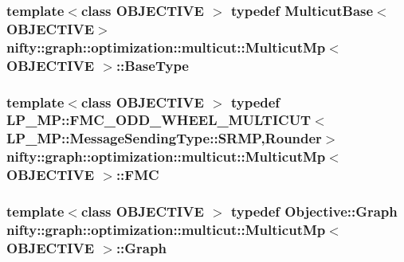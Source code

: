 \subsubsection[{Base\+Type}]{\setlength{\rightskip}{0pt plus 5cm}template$<$class O\+B\+J\+E\+C\+T\+I\+V\+E $>$ typedef {\bf Multicut\+Base}$<$O\+B\+J\+E\+C\+T\+I\+V\+E$>$ {\bf nifty\+::graph\+::optimization\+::multicut\+::\+Multicut\+Mp}$<$ O\+B\+J\+E\+C\+T\+I\+V\+E $>$\+::{\bf Base\+Type}}\label{classnifty_1_1graph_1_1optimization_1_1multicut_1_1MulticutMp_aa1b1a033f9090852c7c4529eec9623ef}
\hypertarget{classnifty_1_1graph_1_1optimization_1_1multicut_1_1MulticutMp_a7552c779f02ea5560312fd9fb10f248d}{}
\subsubsection[{F\+M\+C}]{\setlength{\rightskip}{0pt plus 5cm}template$<$class O\+B\+J\+E\+C\+T\+I\+V\+E $>$ typedef L\+P\+\_\+\+M\+P\+::\+F\+M\+C\+\_\+\+O\+D\+D\+\_\+\+W\+H\+E\+E\+L\+\_\+\+M\+U\+L\+T\+I\+C\+U\+T$<$L\+P\+\_\+\+M\+P\+::\+Message\+Sending\+Type\+::\+S\+R\+M\+P,{\bf Rounder}$>$ {\bf nifty\+::graph\+::optimization\+::multicut\+::\+Multicut\+Mp}$<$ O\+B\+J\+E\+C\+T\+I\+V\+E $>$\+::{\bf F\+M\+C}}\label{classnifty_1_1graph_1_1optimization_1_1multicut_1_1MulticutMp_a7552c779f02ea5560312fd9fb10f248d}
\hypertarget{classnifty_1_1graph_1_1optimization_1_1multicut_1_1MulticutMp_ac12f279cc1b42960983637364ed3bbdc}{}
\subsubsection[{Graph}]{\setlength{\rightskip}{0pt plus 5cm}template$<$class O\+B\+J\+E\+C\+T\+I\+V\+E $>$ typedef Objective\+::\+Graph {\bf nifty\+::graph\+::optimization\+::multicut\+::\+Multicut\+Mp}$<$ O\+B\+J\+E\+C\+T\+I\+V\+E $>$\+::{\bf Graph}}\label{classnifty_1_1graph_1_1optimization_1_1multicut_1_1MulticutMp_ac12f279cc1b42960983637364ed3bbdc}
\hypertarget{classnifty_1_1graph_1_1optimization_1_1multicut_1_1MulticutMp_a43262185c61afcc95eb125ac9d6d0305}{}
